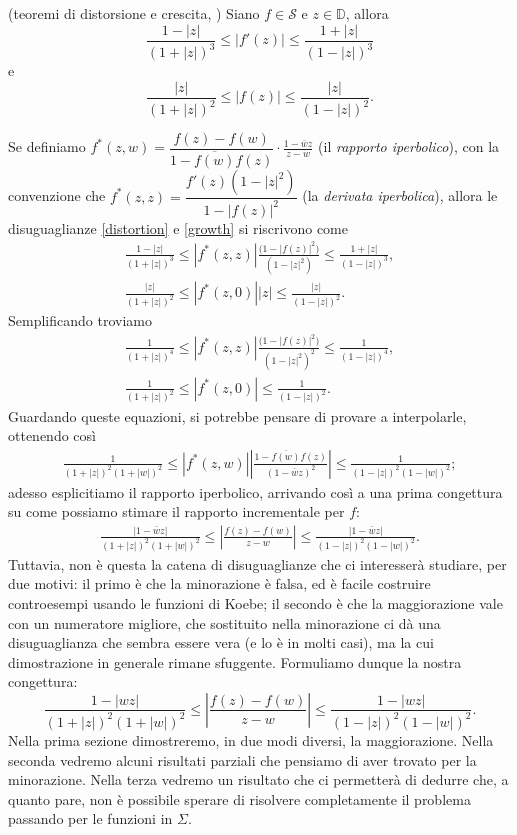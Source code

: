 \begin{thm}
  (teoremi di distorsione e crescita, \cite[Chapter 2.3, Theorems 2.5 and 2.6]{D}) Siano $f \in \mathcal{S}$ e $z \in \mathbb{D}$, allora
  \begin{equation}\label{distortion}
    \frac{1-|z|}{(1+|z|)^3} \le |f'(z)| \le \frac{1+|z|}{(1-|z|)^3}
  \end{equation}
  e
  \begin{equation}\label{growth}
    \frac{|z|}{(1+|z|)^2} \le |f(z)| \le \frac{|z|}{(1-|z|)^2}.
  \end{equation}
\end{thm}
Se definiamo $f^*(z,w)=\dfrac{f(z)-f(w)}{1-\overline{f(w)}f(z)}\cdot\frac{1-\bar{w}z}{z-w}$ (il \textit{rapporto iperbolico}), con la convenzione che $f^*(z,z)=\dfrac{f'(z)(1-|z|^2)}{1-|f(z)|^2}$ (la \textit{derivata iperbolica}), allora le disuguaglianze \eqref{distortion} e \eqref{growth} si riscrivono come
\begin{gather*}
  \frac{1-|z|}{(1+|z|)^3} \le |f^*(z,z)|\frac{\big(1-|f(z)|^2\big)}{(1-|z|^2)} \le \frac{1+|z|}{(1-|z|)^3}, \\
  \frac{|z|}{(1+|z|)^2} \le |f^*(z,0)||z| \le \frac{|z|}{(1-|z|)^2}.
\end{gather*}
Semplificando troviamo
\begin{gather*}
  \frac{1}{(1+|z|)^4} \le |f^*(z,z)|\frac{\big(1-|f(z)|^2\big)}{(1-|z|^2)^2} \le \frac{1}{(1-|z|)^4}, \\
  \frac{1}{(1+|z|)^2} \le |f^*(z,0)| \le \frac{1}{(1-|z|)^2}.
\end{gather*}
Guardando queste equazioni, si potrebbe pensare di provare a interpolarle, ottenendo così
\begin{gather*}
  \frac{1}{(1+|z|)^2(1+|w|)^2} \le |f^*(z,w)| \left|\frac{1-\overline{f(w)}f(z)}{(1-\bar{w}z)^2}\right| \le \frac{1}{(1-|z|)^2(1-|w|)^2};
\end{gather*}
adesso esplicitiamo il rapporto iperbolico, arrivando così a una prima congettura su come possiamo stimare il rapporto incrementale per $f$:
\begin{gather*}
  \frac{|1-\bar{w}z|}{(1+|z|)^2(1+|w|)^2} \le \left|\frac{f(z)-f(w)}{z-w}\right| \le \frac{|1-\bar{w}z|}{(1-|z|)^2(1-|w|)^2}.
\end{gather*}
Tuttavia, non è questa la catena di disuguaglianze che ci interesserà studiare, per due motivi: il primo è che la minorazione è falsa, ed è facile costruire controesempi usando le funzioni di Koebe; il secondo è che la maggiorazione vale con un numeratore migliore, che sostituito nella minorazione ci dà una disuguaglianza che sembra essere vera (e lo è in molti casi), ma la cui dimostrazione in generale rimane sfuggente. Formuliamo dunque la nostra congettura:
\begin{equation}\label{congettura}
  \frac{1-|wz|}{(1+|z|)^2(1+|w|)^2} \le \left|\frac{f(z)-f(w)}{z-w}\right| \le \frac{1-|wz|}{(1-|z|)^2(1-|w|)^2}.
\end{equation}
Nella prima sezione dimostreremo, in due modi diversi, la maggiorazione. Nella seconda vedremo alcuni risultati parziali che pensiamo di aver trovato per la minorazione. Nella terza vedremo un risultato che ci permetterà di dedurre che, a quanto pare, non è possibile sperare di risolvere completamente il problema passando per le funzioni in $\Sigma$.

